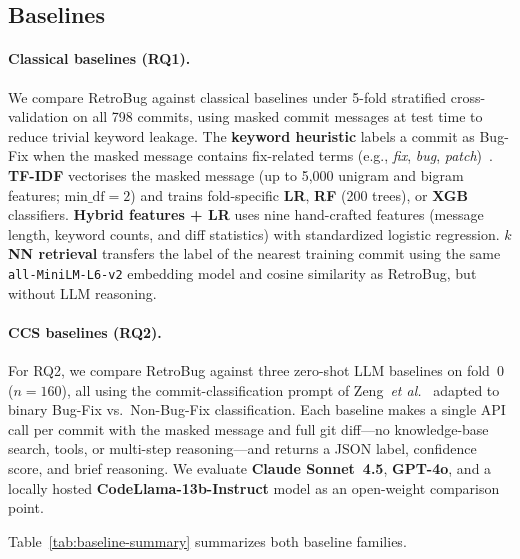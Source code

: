 \subsection{Baselines}
\label{sec:baselines}

\paragraph{Classical baselines (RQ1).}
\label{sec:baselines:classical}
We compare RetroBug against classical baselines under 5-fold
stratified cross-validation on all 798 commits, using masked commit
messages at test time to reduce trivial keyword leakage.
The \textbf{keyword heuristic} labels a commit as Bug-Fix when the
masked message contains fix-related terms (e.g., \emph{fix},
\emph{bug}, \emph{patch})~\cite{tian2012identifying}.
\textbf{TF-IDF} vectorises the masked message (up to 5{,}000 unigram
and bigram features; $\mathrm{min\_df}=2$) and trains fold-specific
\textbf{LR}, \textbf{RF} (200 trees), or \textbf{XGB} classifiers.
\textbf{Hybrid features + LR} uses nine hand-crafted features (message
length, keyword counts, and diff statistics) with standardized
logistic regression.
\textbf{$k$NN retrieval} transfers the label of the nearest training
commit using the same \texttt{all-MiniLM-L6-v2} embedding model and
cosine similarity as RetroBug, but without LLM reasoning.

\paragraph{CCS baselines (RQ2).}
\label{sec:baselines:ccs}
For RQ2, we compare RetroBug against three zero-shot LLM baselines on
fold~0 ($n=160$), all using the commit-classification prompt of
Zeng~\textit{et al.}~\cite{zeng2025conventional} adapted to binary
Bug-Fix vs.\ Non-Bug-Fix classification.
Each baseline makes a single API call per commit with the masked
message and full git diff---no knowledge-base search, tools, or
multi-step reasoning---and returns a JSON label, confidence score, and
brief reasoning.
We evaluate \textbf{Claude Sonnet~4.5}, \textbf{GPT-4o}, and a locally
hosted \textbf{CodeLlama-13b-Instruct} model as an open-weight
comparison point.

Table~\ref{tab:baseline-summary} summarizes both baseline families.

